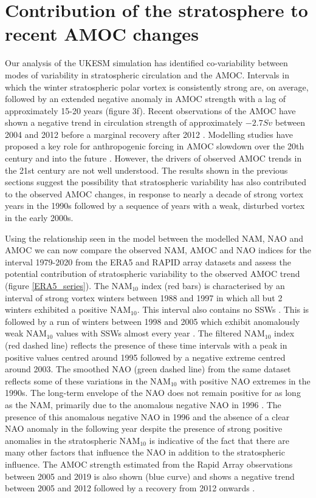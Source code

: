 \section{Contribution of the stratosphere to recent AMOC changes}
\label{sec:AMOC_obs_contribution}
Our analysis of the UKESM simulation has identified co-variability between modes of variability in stratospheric circulation and the AMOC. Intervals in which the winter stratospheric polar vortex is consistently strong are, on average, followed by an extended negative anomaly in AMOC strength with a lag of approximately 15-20 years (figure 3f). Recent observations of the AMOC have shown a negative trend in circulation strength of approximately $-2.7 Sv$ between 2004 and 2012 \citep{smeedNorth2018} before a marginal recovery after 2012 \citep{smeedAtlantic2019}. Modelling studies have proposed a key role for anthropogenic forcing in AMOC slowdown over the 20th century and into the future \citep{liuOverlooked2017, bakkerFate2016, liuMechanisms2019}. However, the drivers of observed AMOC trends in the 21st century are not well understood. The results shown in the previous sections suggest the possibility that stratospheric variability has also contributed to the observed AMOC changes, in response to nearly a decade of strong vortex years in the 1990s followed by a sequence of years with a weak, disturbed vortex in the early 2000s. 

Using the relationship seen in the model between the modelled NAM, NAO and AMOC we can now compare the observed NAM, AMOC and NAO indices for the interval 1979-2020 from the ERA5 and RAPID array datasets and assess the potential contribution of stratospheric variability to the observed AMOC trend (figure \ref{ERA5_series}). The NAM$_{10}$ index (red bars) is characterised by an interval of strong vortex winters between 1988 and 1997 in which all but 2 winters exhibited a positive NAM$_{10}$. This interval also contains no SSWs \citep{pawsonCold1999}. This is followed by a run of winters between 1998 and 2005 which exhibit anomalously weak NAM$_{10}$ values with SSWs almost every year  \cite{manneyRemarkable2005}. The filtered NAM$_{10}$ index (red dashed line) reflects the presence of these time intervals with a peak in positive values centred around 1995 followed by a negative extreme centred around 2003. The smoothed NAO (green dashed line) from the same dataset reflects some of these variations in the NAM$_{10}$ with positive NAO extremes in the 1990s. The long-term envelope of the NAO does not remain positive for as long as the NAM, primarily due to the anomalous negative NAO in 1996 \citep{halpertClimate1997}. The presence of this anomalous negative NAO in 1996 and the absence of a clear NAO anomaly in the following year despite the presence of strong positive anomalies in the stratospheric NAM$_{10}$ is indicative of the fact that there are many other factors that influence the NAO in addition to the stratospheric influence. The AMOC strength estimated from the Rapid Array observations between 2005 and 2019 is also shown (blue curve) and shows a negative trend between 2005 and 2012 followed by a recovery from 2012 onwards \citep{smeedNorth2018b, smeedAtlantic2019c}. 

